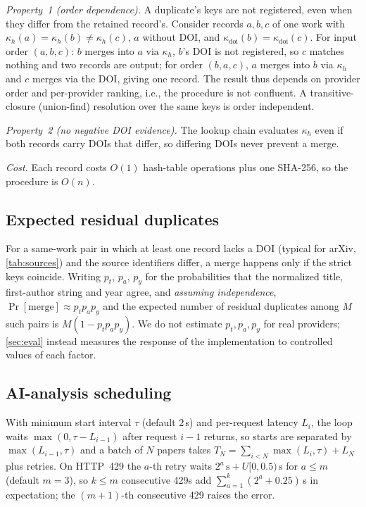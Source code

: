 \documentclass[conference]{IEEEtran}
\begin{document}
\emph{Property~1 (order dependence).} A duplicate's keys are not registered, even when they differ from the retained record's. Consider records $a,b,c$ of one work with $\kappa_h(a)=\kappa_h(b)\ne\kappa_h(c)$, $a$ without DOI, and $\kappa_{\text{doi}}(b)=\kappa_{\text{doi}}(c)$. For input order $(a,b,c)$: $b$ merges into $a$ via $\kappa_h$, $b$'s DOI is not registered, so $c$ matches nothing and two records are output; for order $(b,a,c)$, $a$ merges into $b$ via $\kappa_h$ and $c$ merges via the DOI, giving one record. The result thus depends on provider order and per-provider ranking, i.e., the procedure is not confluent. A transitive-closure (union-find) resolution over the same keys is order independent.

\emph{Property~2 (no negative DOI evidence).} The lookup chain evaluates $\kappa_h$ even if both records carry DOIs that differ, so differing DOIs never prevent a merge.

\emph{Cost.} Each record costs $O(1)$ hash-table operations plus one SHA-256, so the procedure is $O(n)$.

\subsection{Expected residual duplicates}
For a same-work pair in which at least one record lacks a DOI (typical for arXiv, \cref{tab:sources}) and the source identifiers differ, a merge happens only if the strict keys coincide. Writing $p_t$, $p_a$, $p_y$ for the probabilities that the normalized title, first-author string and year agree, and \emph{assuming independence}, $\Pr[\text{merge}]\approx p_tp_ap_y$ and the expected number of residual duplicates among $M$ such pairs is $M(1-p_tp_ap_y)$. We do not estimate $p_t,p_a,p_y$ for real providers; \cref{sec:eval} instead measures the response of the implementation to controlled values of each factor.

\subsection{AI-analysis scheduling}
With minimum start interval $\tau$ (default $2$\,s) and per-request latency $L_i$, the loop waits $\max(0,\tau-L_{i-1})$ after request $i{-}1$ returns, so starts are separated by $\max(L_{i-1},\tau)$ and a batch of $N$ papers takes $T_N=\sum_{i<N}\max(L_i,\tau)+L_N$ plus retries. On HTTP~429 the $a$-th retry waits $2^{a}\,\text{s}+U[0,0.5)\,\text{s}$ for $a\le m$ (default $m=3$), so $k\le m$ consecutive 429s add $\sum_{a=1}^{k}(2^a+0.25)$\,s in expectation; the $(m{+}1)$-th consecutive 429 raises the error.
\end{document}
